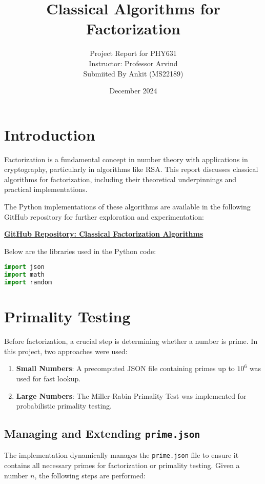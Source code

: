 \documentclass[12pt]{report}
\begin{document}
\title{Classical Algorithms for Factorization}
\author{Project Report for PHY631 \\
Instructor: Professor Arvind \\
Submiited By Ankit (MS22189)}
\date{December 2024}
\maketitle

\tableofcontents  %
\clearpage  %

\section{Introduction}
Factorization is a fundamental concept in number theory with applications in cryptography, particularly in algorithms like RSA. This report discusses classical algorithms for factorization, including their theoretical underpinnings and practical implementations.

The Python implementations of these algorithms are available in the following GitHub repository for further exploration and experimentation:
\begin{center}
\textbf{\href{https://github.com/Ankitk108/Classical-Algorithms-for-Factorization}{GitHub Repository: Classical Factorization Algorithms}}
\end{center}

Below are the libraries used in the Python code:
\begin{lstlisting}[language=Python]
import json
import math
import random
\end{lstlisting}


\section{Primality Testing}
Before factorization, a crucial step is determining whether a number is prime. In this project, two approaches were used:
\begin{enumerate}
    \item \textbf{Small Numbers}: A precomputed JSON file containing primes up to $10^6$ was used for fast lookup.
    \item \textbf{Large Numbers}: The Miller-Rabin Primality Test was implemented for probabilistic primality testing.
\end{enumerate}

\subsection{Managing and Extending \texttt{prime.json}}
The implementation dynamically manages the \texttt{prime.json} file to ensure it contains all necessary primes for factorization or primality testing. Given a number $n$, the following steps are performed:
\end{document}
